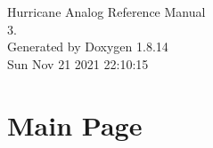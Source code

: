 \documentclass[a4paper]{asimbook}
\begin{document}
   \begin{titlepage}
     \vspace*{7cm}
     \begin{center}
     {\Large Hurricane Analog Reference Manual\\[1ex]\large 3. }\\
     \vspace*{1cm}
     {\large Generated by Doxygen 1.8.14}\\
     \vspace*{0.5cm}
     {\small Sun Nov 21 2021 22:10:15}\\
     \end{center}
   \end{titlepage}

   \clearemptydoublepage

   \tableofcontents
   \clearemptydoublepage

\chapter{Main Page}
\label{index}\hypertarget{index}{}

\backmatter
\newpage
{}
\clearemptydoublepage
{}
\printindex
\end{document}
